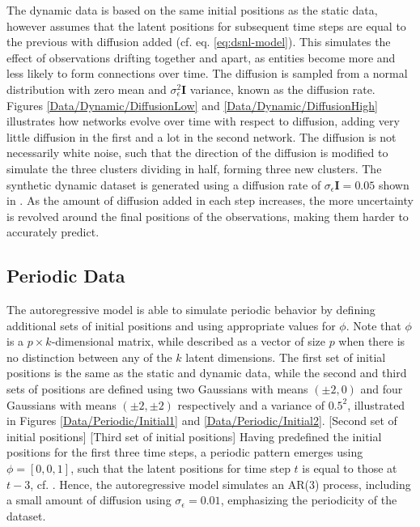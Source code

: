         The dynamic data is based on the same initial positions as the static data, however assumes that the latent positions for subsequent time steps are equal to the previous with diffusion added (cf. eq. \ref{eq:dsnl-model}). This simulates the effect of observations drifting together and apart, as entities become more and less likely to form connections over time. The diffusion is sampled from a normal distribution with zero mean and $\sigma_\epsilon^2\bm{I}$ variance, known as the diffusion rate. Figures \ref{Data/Dynamic/DiffusionLow} and \ref{Data/Dynamic/DiffusionHigh} illustrates how networks evolve over time with respect to diffusion, adding very little diffusion in the first and a lot in the second network.
        The diffusion is not necessarily white noise, such that the direction of the diffusion is modified to simulate the three clusters dividing in half, forming three new clusters.
        The synthetic dynamic dataset is generated using a diffusion rate of $\sigma_\epsilon\bm{I}=0.05$ shown in . 
        As the amount of diffusion added in each step increases, the more uncertainty is revolved around the final positions of the observations, making them harder to accurately predict.
    
    \subsection{Periodic Data}
    
        The autoregressive model is able to simulate periodic behavior by defining additional sets of initial positions and using appropriate values for $\phi$. Note that $\phi$ is a $p\times k$-dimensional matrix, while described as a vector of size $p$ when there is no distinction between any of the $k$ latent dimensions.
        The first set of initial positions is the same as the static and dynamic data, while the second and third sets of positions are defined using two Gaussians with means $(\pm2,0)$ and four Gaussians with means $(\pm2,\pm2)$ respectively and a variance of $0.5^2$, illustrated in Figures \ref{Data/Periodic/Initial1} and \ref{Data/Periodic/Initial2}.
        \xdouble
        {[Second set of initial positions]}
        {[Third set of initial positions]}
        Having predefined the initial positions for the first three time steps, a periodic pattern emerges using $\phi=[0, 0, 1]$, such that the latent positions for time step $t$ is equal to those at $t-3$, cf. .
        Hence, the autoregressive model simulates an AR(3) process, including a small amount of diffusion using $\sigma_\epsilon=0.01$, emphasizing the periodicity of the dataset.
        
